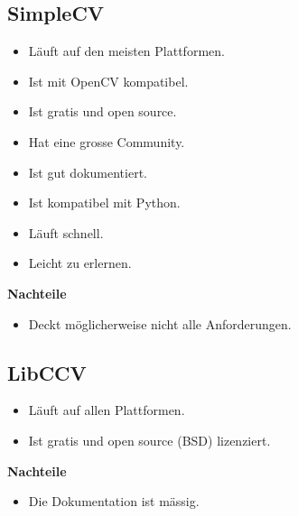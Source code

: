 \subsection {SimpleCV}

\begin{itemize}
\item Läuft auf den meisten Plattformen.
\item Ist mit OpenCV kompatibel.
\item Ist gratis und open source.
\item Hat eine grosse Community.
\item Ist gut dokumentiert.
\item Ist kompatibel mit Python.
\item Läuft schnell.
\item Leicht zu erlernen.
\end{itemize}
\textbf {Nachteile}
\begin{itemize}
\item Deckt möglicherweise nicht alle Anforderungen.	
\end{itemize}

\subsection {LibCCV}
\begin{itemize}
\item Läuft auf allen Plattformen.
\item Ist gratis und open source (BSD) lizenziert.
\end{itemize}
\textbf {Nachteile}
\begin{itemize}
\item Die Dokumentation ist mässig.
\end{itemize}




